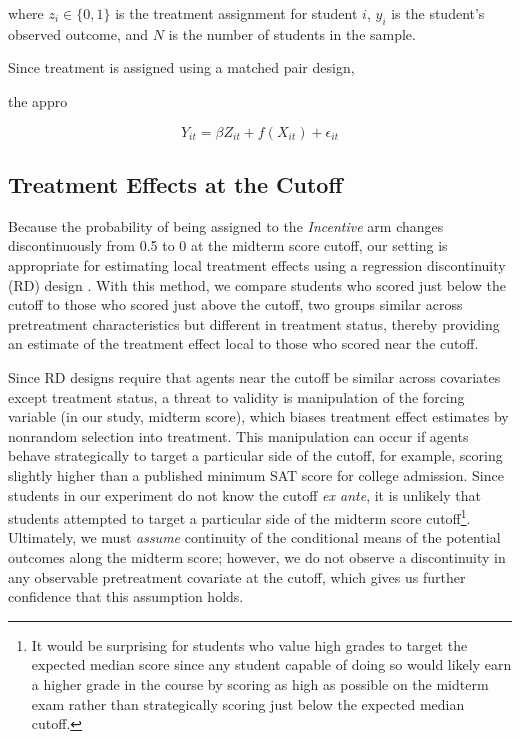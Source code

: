 \documentclass[12pt]{article}
\begin{document}
where $z_i \in \{0,1\}$ is the treatment assignment for student $i$, $y_i$ is the student's observed outcome, and $N$ is the number of students in the sample.

Since treatment is assigned using a matched pair design,

 the appro

\begin{equation}
	Y_{it} = \beta Z_{it} + f(X_{it}) + \epsilon_{it}
\end{equation}



\subsection{Treatment Effects at the Cutoff}

Because the probability of being assigned to the \textit{Incentive} arm changes discontinuously from 0.5 to 0 at the midterm score cutoff, our setting is appropriate for estimating local treatment effects using a regression discontinuity (RD) design \citep{tc1960, ap2008, il2008}. With this method, we compare students who scored just below the cutoff to those who scored just above the cutoff, two groups similar across pretreatment characteristics but different in treatment status, thereby providing an estimate of the treatment effect local to those who scored near the cutoff.

Since RD designs require that agents near the cutoff be similar across covariates except treatment status, a threat to validity is manipulation of the forcing variable (in our study, midterm score), which biases treatment effect estimates by nonrandom selection into treatment. This manipulation can occur if agents behave strategically to target a particular side of the cutoff, for example, scoring slightly higher than a published minimum SAT score for college admission. Since students in our experiment do not know the cutoff \textit{ex ante}, it is unlikely that students attempted to target a particular side of the midterm score cutoff\footnote{It would be surprising for students who value high grades to target the expected median score since any student capable of doing so would likely earn a higher grade in the course by scoring as high as possible on the midterm exam rather than strategically scoring just below the expected median cutoff.}. Ultimately, we must \textit{assume} continuity of the conditional means of the potential outcomes along the midterm score; however, we do not observe a discontinuity in any observable pretreatment covariate at the cutoff, which gives us further confidence that this assumption holds.
\end{document}
